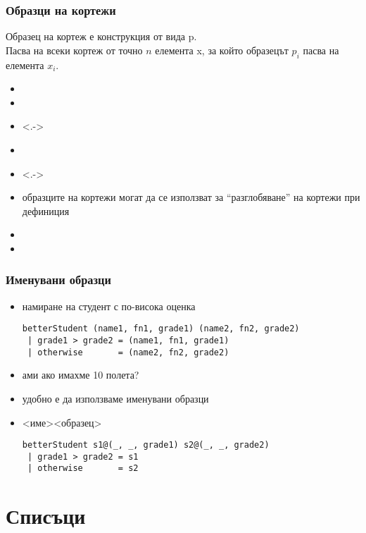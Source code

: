 \documentclass[alsotrans]{beamerswitch}
\begin{document}
\begin{frame}[fragile]
  \frametitle{Образци на кортежи}

  Образец на кортеж е конструкция от вида \tuple p.\\\pause
  Пасва на всеки кортеж от точно $n$ елемента \tuple x, за който образецът $p_i$ пасва на елемента $x_i$.
  \onslide<+->
  \begin{itemize}[<+->]
  \item {}
  \item {}
  \item<.-> 
  \item {}
  \item<.-> 
  \item образците на кортежи могат да се използват за ``разглобяване'' на кортежи при дефиниция
  \item {}
  \item {}
  \end{itemize}
\end{frame}

\begin{frame}[fragile]
  \frametitle{Именувани образци}

  \begin{itemize}[<+->]
  \item намиране на студент с по-висока оценка
\begin{lstlisting}
betterStudent (name1, fn1, grade1) (name2, fn2, grade2)
 | grade1 > grade2 = (name1, fn1, grade1)
 | otherwise       = (name2, fn2, grade2)
\end{lstlisting}
  \item ами ако имахме 10 полета?
  \item удобно е да използваме \alert{именувани образци}
  \item{} <име>\tta@<образец> \onslide<+->
\lstset{escapechar=!}
\begin{lstlisting}
betterStudent s1@(_, _, grade1) s2@(_, _, grade2)
 | grade1 > grade2 = s1
 | otherwise       = s2
\end{lstlisting}
\lstset{escapechar=@}
  \end{itemize}
\end{frame}

\section{Списъци}
\end{document}
